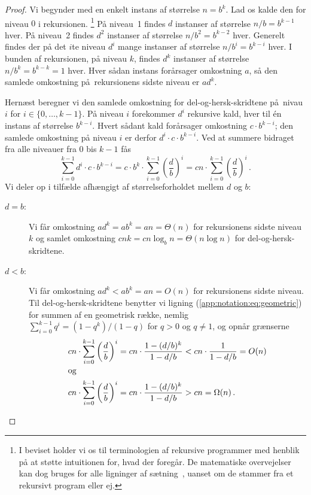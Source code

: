 \begin{proof} 
  Vi begynder med en enkelt instans af størrelse $n = b^k$. 
  Lad os kalde den for niveau $0$ i rekursionen.%
  \footnote{I beviset holder vi os til terminologien af rekursive programmer med henblik på at støtte intuitionen for, hvad der foregår.
  De matematiske overvejelser kan dog bruges for alle ligninger af sætning~, uanset om de stammer fra et rekursivt program eller ej.}
  På niveau~1 findes $d$ instanser af størrelse $n/b = b^{k - 1}$ hver.
  På niveau~2 findes $d^2$ instanser af størrelse $n/b^2 = b^{k - 2}$ hver.
  Generelt findes der på det $i$te niveau $d^i$ mange instanser af størrelse $n/b^i = b^{k - i}$ hver.
  I bunden af rekursionen, på niveau $k$, findes $d^k$ instanser af størrelse $n/b^k = b^{k - k} = 1$ hver.
  Hver sådan instans forårsager omkostning $a$, så den samlede omkostning på rekursionens sidste niveau er $ad^k$.

  Hernæst beregner vi den samlede omkostning for del-og-hersk-skridtene på nivau $i$ for $i\in\{0,\ldots, k - 1\}$. 
  På niveau $i$ forekommer $d^i$ rekursive kald, hver til én instans af størrelse $b^{k-i}$. 
  Hvert sådant kald forårsager omkostning $ c \cdot b^{k - i}$;
  den samlede omkostning på niveau $i$ er derfor $d^i\cdot c\cdot b^{k-i}$. 
  Ved at summere bidraget fra alle niveauer fra $0$ bis $k-1$ fås
  \[ \sum_{i=0}^{k-1}d^i\cdot c\cdot b^{k-i}=
  c\cdot
  b^k \cdot \sum_{i=0}^{k-1}\left(\frac{d}{b}\right)^i=cn \cdot \sum_{i=0}^{k-1}\left(\frac{d}{b}\right)^i\,.
  \]
  Vi deler op i tilfælde afhængigt af størrelseforholdet mellem $d$ og $b$:
  \begin{description}
    \item[$d=b$:]
      Vi får omkostning $ad^k=ab^k=an=\Theta(n)$ for rekursionens sidste niveau $k$ og
      samlet omkostning $cnk=cn\log_{b}n=\Theta(n\log n)$ for del-og-hersk-skridtene.

\item[$d<b$:] Vi får omkostning $ad^k<ab^k=an=O(n)$ for rekursionens sidste niveau.
  Til del-og-hersk-skridtene benytter vi ligning (\ref{app:notation:eq:geometric}) for summen af en geometrisk række,
  nemlig $\sum_{i=0}^{k-1} q^i = (1 - q^k)/(1 - q)$ for
  $q > 0$ og $q \not= 1$, og opnår grænserne
  \begin{align*}
    cn \cdot \sum_{i=0}^{k-1}\left(\frac{d}{b}\right)^i & = cn \cdot
    \frac{1-(d/b)^k}{1-d/b} < cn \cdot \frac{1}{1-d/b} =O(n)\\
    \intertext{og}      %
    cn \cdot \sum_{i=0}^{k-1}\left(\frac{d}{b}\right)^i &= cn \cdot
    \frac{1-(d/b)^k}{1-d/b}>cn =\Omega(n)\,.
  \end{align*}


\end{description}
\end{proof}
